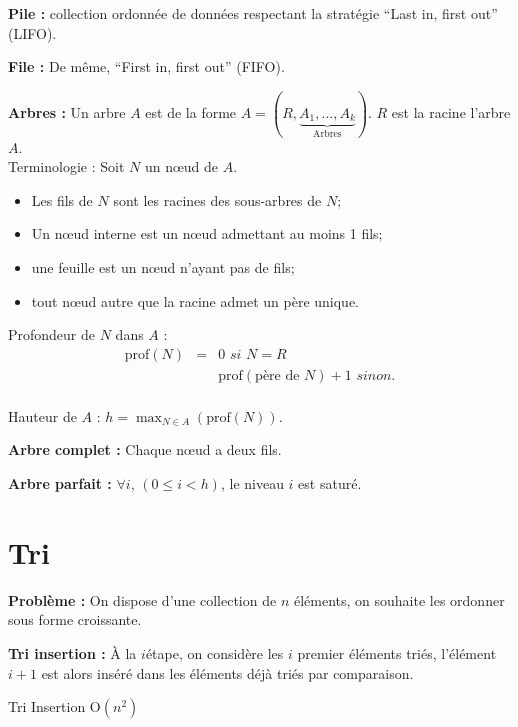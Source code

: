 \documentclass[a4paper, 8pt]{article}
\begin{document}
\begin{multicols*}{3}
\textbf{Pile :} collection ordonnée de données respectant la stratégie \enquote{Last in, first out} (LIFO).

\textbf{File :} De même, \enquote{First in, first out} (FIFO).

\textbf{Arbres :} Un arbre $A$ est de la forme $A = (R, \underbrace{A_1, \ldots, A_k}_{\text{Arbres}})$. $R$ est la racine l'arbre $A$.\\
Terminologie : Soit $N$ un nœud de $A$.
\begin{itemize}
\item Les fils de $N$ sont les racines des sous-arbres de $N$;
\item Un nœud interne est un nœud admettant au moins 1 fils;
\item une feuille est un nœud n'ayant pas de fils;
\item tout nœud autre que la racine admet un père unique.
\end{itemize}

Profondeur de $N$ dans $A$ :
\[
\begin{array}{rc|l}
\text{prof}(N) & = & 0 \textit{ si } N=R  \\
 & & \text{prof}(\text{père de }N) + 1 \textit{ sinon.}  \\
\end{array}
\]

Hauteur de $A$ : $h = \displaystyle \max_{N\in A}\left(\text{prof}(N)\right).$

\textbf{Arbre complet :} Chaque nœud a deux fils.

\textbf{Arbre parfait :} $\forall i$, $(0 \leqslant i < h)$, le niveau $i$ est saturé.

\section*{Tri}

\newcommand{\GO}{\text{O}}

\textbf{Problème :} On dispose d'une collection de $n$ éléments, on souhaite les ordonner sous forme croissante.

\textbf{Tri insertion :} \`{A} la $i$\ieme étape, on considère les $i$ premier éléments triés, l'élément $i+1$ est alors inséré dans les éléments déjà triés par comparaison.
\begin{algorithm}[H]
 \caption{Tri Insertion $\GO(n^2)$}
\end{algorithm}


\end{multicols*}
\end{document}
